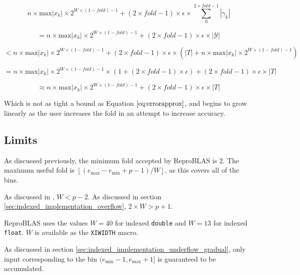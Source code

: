 \documentclass[12pt]{article}
\providecommand{\floor}[1]{\left \lfloor #1 \right \rfloor }
\providecommand{\min}{\ensuremath{\text{min}}}
\providecommand{\max}{\ensuremath{\text{max}}}
\theoremstyle{plain}
\numberwithin{equation}{section}
\begin{document}
    \begin{equation*}
    n \times \max|x_k|\times 2^{W \times (1 - fold) - 1} + (2 \times fold - 1) \times \epsilon \times \sum\limits_0^{2 \times fold - 1}|\gamma_k|
    \end{equation*}

    \begin{equation*}
    = n \times \max|x_k|\times 2^{W \times (1 - fold) - 1} + (2 \times fold - 1) \times \epsilon \times |\mathcal{Y}|
    \end{equation*}

    \begin{equation*}
    < n \times \max|x_k|\times 2^{W \times (1 - fold) - 1} + (2 \times fold - 1) \times \epsilon \times (|T| + n \times \max|x_k|\times 2^{W \times (1 - fold) - 1})
    \end{equation*}

    \begin{equation*}
    = n \times \max|x_k|\times 2^{W \times (1 - fold) - 1}\times (1 + (2 \times fold - 1)\times \epsilon) + (2 \times fold - 1) \times \epsilon \times |T|
    \end{equation*}

    \begin{equation*}
    \approx n \times \max|x_k|\times 2^{W \times (1 - fold) - 1} + (2 \times fold - 1) \times \epsilon \times |T|
    \end{equation*}

    Which is not as tight a bound as Equation $\ref{eq:errorapprox}$, and begins to grow linearly as the user increases the fold in an attempt to increase accuracy.

  \subsection{Limits}
    \label{sec:limits}
    As discussed previously, the minimum fold accepted by ReproBLAS is 2. The maximum useful fold is $\floor{(e_{\max} - e_{\min} + p - 1)/W}$, as this covers all of the bins.

    As discussed in \cite{repsum}, $W < p - 2$. As discussed in section \ref{sec:indexed_implementation_overflow}, $2\times W > p + 1$.

    ReproBLAS uses the values $W = 40$ for indexed \verb|double| and $W = 13$ for indexed \verb|float|. $W$ is available as the \verb|XIWIDTH| macro.

    As discussed in section \ref{sec:indexed_implementation_underflow_gradual}, only input corresponding to the bin $(e_{\min} - 1, e_{\max} + 1]$ is guaranteed to be accumulated.
\end{document}
